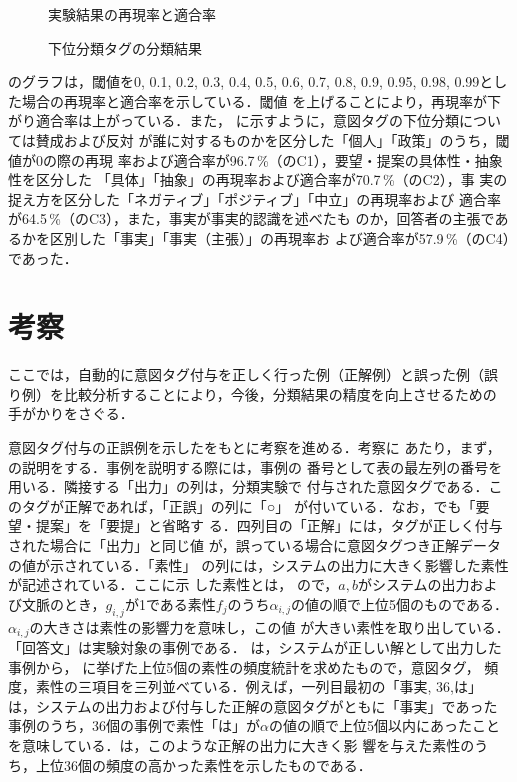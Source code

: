 \begin{figure}[t]
\begin{center}
\leavevmode
{}
\caption{実験結果の再現率と適合率}
\label{fig:figure4}
\end{center}
\end{figure}

\begin{figure}[t]
\begin{center}
\leavevmode
{}
\caption{下位分類タグの分類結果}
\label{fig:figure5}
\end{center}
\end{figure}

のグラフは，閾値を0, 0.1, 0.2, 0.3, 0.4, 0.5, 0.6, 0.7,
0.8, 0.9, 0.95, 0.98, 0.99とした場合の再現率と適合率を示している．閾値
を上げることにより，再現率が下がり適合率は上がっている．また，
に示すように，意図タグの下位分類については賛成および反対
が誰に対するものかを区分した「個人」「政策」のうち，閾値が0の際の再現
率および適合率が96.7\,\%（のC1），要望・提案の具体性・抽象
性を区分した
「具体」「抽象」の再現率および適合率が70.7\,\%（のC2），事
実の捉え方を区分した「ネガティブ」「ポジティブ」「中立」の再現率および
適合率が64.5\,\%（のC3），また，事実が事実的認識を述べたも
のか，回答者の主張であるかを区別した「事実」「事実（主張）」の再現率お
よび適合率が57.9\,\%（のC4）であった．

\section{考察}
\label{sec:consideration}

ここでは，自動的に意図タグ付与を正しく行った例（正解例）と誤った例（誤
り例）を比較分析することにより，今後，分類結果の精度を向上させるための
手がかりをさぐる．

意図タグ付与の正誤例を示したをもとに考察を進める．考察に
あたり，まず，の説明をする．事例を説明する際には，事例の
番号として表の最左列の番号を用いる．隣接する「出力」の列は，分類実験で
付与された意図タグである．このタグが正解であれば，「正誤」の列に「○」
が付いている．なお，でも「要望・提案」を「要提」と省略す
る．四列目の「正解」には，タグが正しく付与された場合に「出力」と同じ値
が，誤っている場合に意図タグつき正解データの値が示されている．「素性」
の列には，システムの出力に大きく影響した素性が記述されている．ここに示
した素性とは， ので，$a,b$がシステムの出力およ
び文脈のとき，$g_{i,j}$が1である素性$f_{j}$のうち$\alpha_{i,j}$の値の順で上位5個のものである．$\alpha_{i,j}$の大きさは素性の影響力を意味し，この値
が大きい素性を取り出している．「回答文」は実験対象の事例である．
は，システムが正しい解として出力した事例から，
に挙げた上位5個の素性の頻度統計を求めたもので，意図タグ，
頻度，素性の三項目を三列並べている．例えば，一列目最初の「事実, 36,は」
は，システムの出力および付与した正解の意図タグがともに「事実」であった
事例のうち，36個の事例で素性「は」が$\alpha$の値の順で上位5個以内にあったこと
を意味している．は，このような正解の出力に大きく影
響を与えた素性のうち，上位36個の頻度の高かった素性を示したものである．


